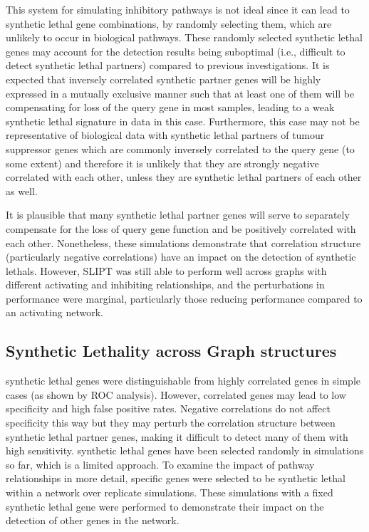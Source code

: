 This system for simulating inhibitory pathways is not ideal since it can lead to \gls{synthetic lethal} gene combinations, by randomly selecting them, which are unlikely to occur in biological pathways. These randomly selected \gls{synthetic lethal} genes may account for the detection results being suboptimal (i.e., difficult to detect \gls{synthetic lethal} partners) compared to previous investigations. It is expected that inversely correlated synthetic partner genes will be highly expressed in a mutually exclusive manner such that at least one of them will be compensating for loss of the query gene in most samples, leading to a weak \gls{synthetic lethal} signature in  data in this case. Furthermore, this case may not be representative of biological data with \gls{synthetic lethal} partners of \gls{tumour suppressor} genes which are commonly inversely correlated to the query gene (to some extent) and therefore it is unlikely that they are strongly negative correlated with each other, unless they are \gls{synthetic lethal} partners of each other as well.

It is plausible that many \gls{synthetic lethal} partner genes will serve to separately compensate for the loss of query gene function and be positively correlated with each other. Nonetheless, these simulations demonstrate that correlation structure (particularly negative correlations) have an impact on the detection of \glspl{synthetic lethal}. However, \gls{SLIPT} was still able to perform well across \glspl{graph} with different activating and inhibiting relationships, and the perturbations in performance were marginal, particularly those reducing performance compared to an activating network.  

\FloatBarrier

\subsection{Synthetic Lethality across Graph structures}
\label{chapt5:graphsim_str}

\FloatBarrier

\Gls{synthetic lethal} genes were distinguishable from highly correlated genes in simple cases (as shown by \gls{ROC} analysis). However, correlated genes may lead to low specificity and high false positive rates. Negative correlations do not affect specificity this way but they may perturb the correlation structure between \gls{synthetic lethal} partner genes, making it difficult to detect many of them with high sensitivity. \Gls{synthetic lethal} genes have been selected randomly in simulations so far, which is a limited approach. To examine the impact of pathway relationships in more detail, specific genes were selected to be \gls{synthetic lethal} within a network over replicate simulations. %
These simulations with a fixed \gls{synthetic lethal} gene were performed to demonstrate their impact on the detection of other genes in the network. %

